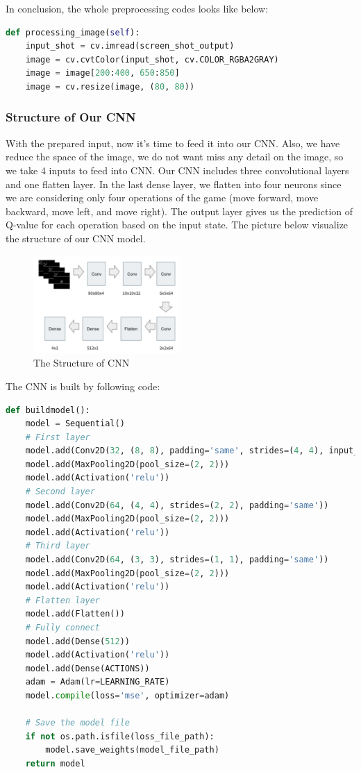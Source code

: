\documentclass{article}
\begin{document}
In conclusion, the whole preprocessing codes looks like below:
\begin{lstlisting}[language=Python]
def processing_image(self):
    input_shot = cv.imread(screen_shot_output)
    image = cv.cvtColor(input_shot, cv.COLOR_RGBA2GRAY)
    image = image[200:400, 650:850]
    image = cv.resize(image, (80, 80))
\end{lstlisting}


\subsubsection{Structure of Our CNN}
With the prepared input, now it's time to feed it into our CNN. Also, we have reduce the space of the image, we do not want miss any detail on the image, so we take 4 inputs to feed into CNN. Our CNN includes three convolutional layers and one flatten layer. In the last dense layer, we flatten into four neurons since we are considering only four operations of the game (move forward, move backward, move left, and move right). The output layer gives us the prediction of Q-value for each operation based on the input state. The picture below visualize the structure of our CNN model. 

\begin{figure}[h]
\caption{The Structure of CNN}
\centering
\includegraphics[width=0.5\textwidth]{CNN.png}
\end{figure}

The CNN is built by following code:
\begin{lstlisting}[language=Python]
def buildmodel():
    model = Sequential()
    # First layer
    model.add(Conv2D(32, (8, 8), padding='same', strides=(4, 4), input_shape=(img_cols, img_rows, img_channels)))
    model.add(MaxPooling2D(pool_size=(2, 2)))
    model.add(Activation('relu'))
    # Second layer
    model.add(Conv2D(64, (4, 4), strides=(2, 2), padding='same'))
    model.add(MaxPooling2D(pool_size=(2, 2)))
    model.add(Activation('relu'))
    # Third layer
    model.add(Conv2D(64, (3, 3), strides=(1, 1), padding='same'))
    model.add(MaxPooling2D(pool_size=(2, 2)))
    model.add(Activation('relu'))
    # Flatten layer
    model.add(Flatten())
    # Fully connect
    model.add(Dense(512))
    model.add(Activation('relu'))
    model.add(Dense(ACTIONS))
    adam = Adam(lr=LEARNING_RATE)
    model.compile(loss='mse', optimizer=adam)

    # Save the model file
    if not os.path.isfile(loss_file_path):
        model.save_weights(model_file_path)
    return model
\end{lstlisting}
\end{document}
